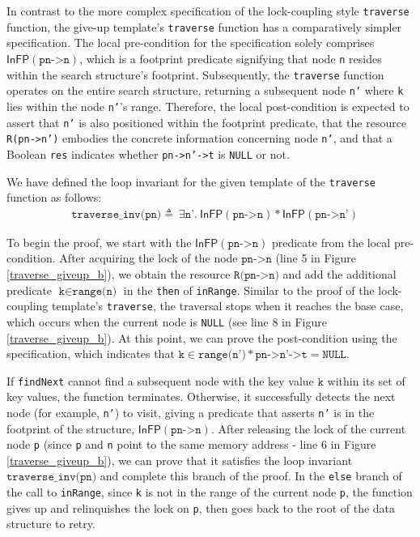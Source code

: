 \documentclass[a4paper,UKenglish,cleveref, autoref, thm-restate]{lipics-v2021}
\newcommand{\infp}{\ensuremath{\mathsf{InFP}}}
\begin{document}
In contrast to the more complex specification of the lock-coupling style \texttt{traverse} function, the give-up template's \texttt{traverse} function has a comparatively simpler specification. The local pre-condition for the specification solely comprises $\infp(\texttt{pn->n})$, which is a footprint predicate signifying that node \texttt{n} resides within the search structure's footprint. Subsequently, the \texttt{traverse} function operates on the entire search structure, returning a subsequent node \texttt{n'} where \texttt{k} lies within the node \texttt{n'}'s range. Therefore, the local post-condition is expected to assert that \texttt{n'} is also positioned within the footprint predicate, that the resource \texttt{R(pn->n')} embodies the concrete information concerning node \texttt{n'}, and that a Boolean \texttt{res} indicates whether \texttt{pn->n'->t} is \texttt{NULL} or not.

We have defined the loop invariant for the given template of the \texttt{traverse} function as follows: 
\begin{align*} &\texttt{traverse\_inv(pn)} \triangleq\ \exists \texttt{n'}.\ \infp (\texttt{pn->n}) \ast \infp (\texttt{pn->n'})   
\end{align*}

To begin the proof, we start with the $\infp (\texttt{pn->n})$ predicate from the local pre-condition. After acquiring the lock of the node $\texttt{pn->n}$ (line 5 in Figure \ref{traverse_giveup_b}), we obtain the resource $\texttt{R(pn->n)}$ and add the additional predicate $\texttt{k} \in \texttt{range(n)}$ in the \texttt{then} of \texttt{inRange}. Similar to the proof of the lock-coupling template's \texttt{traverse}, the traversal stops when it reaches the base case, which occurs when the current node is \lstinline{NULL} (see line 8 in Figure \ref{traverse_giveup_b}). At this point, we can prove the post-condition using the specification, which indicates that $\texttt{k} \in \texttt{range(n')} \ast \texttt{pn->n'->t} = \texttt{NULL}$.

If \lstinline{findNext} cannot find a subsequent node with the key value $\texttt{k}$ within its set of key values, the function terminates. Otherwise, it successfully detects the next node (for example, \texttt{n'}) to visit, giving a predicate that asserts \texttt{n'} is in the footprint of the structure, $\infp(\texttt{pn->n})$. After releasing the lock of the current node \texttt{p} (since \texttt{p} and \texttt{n} point to the same memory address - line 6 in Figure \ref{traverse_giveup_b}), we can prove that it satisfies the loop invariant $\texttt{traverse\_inv(pn)}$ and complete this branch of the proof. In the \texttt{else} branch of the call to \texttt{inRange}, since \texttt{k} is not in the range of the current node \texttt{p}, the function gives up and relinquishes the lock on \texttt{p}, then goes back to the root of the data structure to retry.
\end{document}
